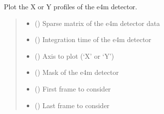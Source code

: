 \documentclass[letterpaper,10pt,english]{sphinxmanual}
\begin{document}
\begin{fulllineitems}
\label{\detokenize{index:XPCS_tools.plot_XYprofile}}
\pysigstartsignatures
\pysiglinewithargsret
{}
{\sphinxparamcomma {}\sphinxparamcomma {}\sphinxparamcomma {}\sphinxparamcomma {}\sphinxparamcomma {}}
{}
\pysigstopsignatures
\sphinxAtStartPar
Plot the X or Y profiles of the e4m detector.
\begin{quote}\begin{description}
\begin{itemize}
\item {} 
\sphinxAtStartPar
{} () \textendash{} Sparse matrix of the e4m detector data

\item {} 
\sphinxAtStartPar
{} () \textendash{} Integration time of the e4m detector

\item {} 
\sphinxAtStartPar
{} () \textendash{} Axis to plot (‘X’ or ‘Y’)

\item {} 
\sphinxAtStartPar
{} () \textendash{} Mask of the e4m detector

\item {} 
\sphinxAtStartPar
{} () \textendash{} First frame to consider

\item {} 
\sphinxAtStartPar
{} () \textendash{} Last frame to consider

\end{itemize}

\end{description}\end{quote}

\end{fulllineitems}
\end{document}
